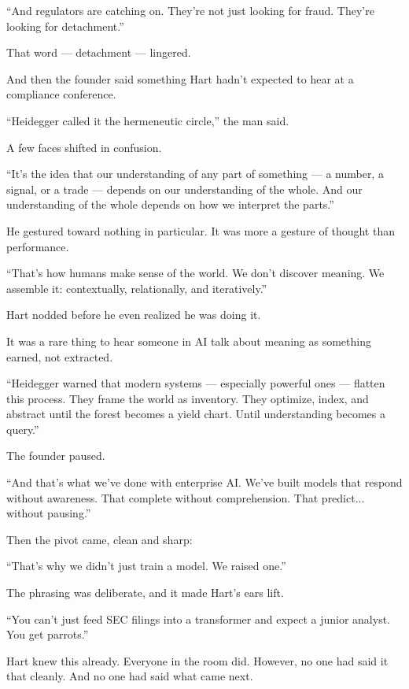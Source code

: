``And regulators are catching on.
They’re not just looking for fraud.
They’re looking for detachment.''



That word — detachment — lingered.

And then the founder said something Hart hadn’t expected to hear at a compliance conference.

``Heidegger called it the hermeneutic circle,'' the man said.

A few faces shifted in confusion.

``It’s the idea that our understanding of any part of something 
--- a number, a signal, or a trade --- 
depends on our understanding of the whole. 
And our understanding of the whole depends on how we interpret the parts.''

He gestured toward nothing in particular. It was more a gesture of thought than performance.

``That’s how humans make sense of the world.
We don’t discover meaning. We assemble it: contextually, relationally, and iteratively.''

Hart nodded before he even realized he was doing it.

It was a rare thing to hear someone in AI talk about meaning as something earned, not extracted.

``Heidegger warned that modern systems 
--- especially powerful ones --- 
flatten this process.
They frame the world as inventory.
They optimize, index, and abstract until the forest becomes a yield chart.
Until understanding becomes a query.''

The founder paused.

``And that’s what we’ve done with enterprise AI.
We’ve built models that respond without awareness.
That complete without comprehension.
That predict... without pausing.''

Then the pivot came, clean and sharp:

``That’s why we didn’t just train a model.
We raised one.''







The phrasing was deliberate, and it made Hart’s ears lift.

``You can’t just feed SEC filings into a transformer and expect a junior analyst. You get parrots.''

Hart knew this already. 
Everyone in the room did. 
However, no one had said it that cleanly. 
And no one had said what came next.


